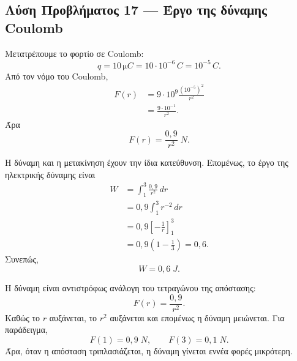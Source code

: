 \subsection*{Λύση Προβλήματος 17 --- Έργο της δύναμης Coulomb}

\begin{alist}
  \item Μετατρέπουμε το φορτίο σε Coulomb:
        \[
          q=10\,\si{\micro C}=10\cdot10^{-6}\,\si{C}=10^{-5}\,\si{C}.
        \]
        Από τον νόμο του Coulomb,
        \begin{align*}
          F(r)
          &=9\cdot10^9\frac{(10^{-5})^2}{r^2}\\
          &=\frac{9\cdot10^{-1}}{r^2}.
        \end{align*}
        Άρα
        \[
          {F(r)=\frac{0{,}9}{r^2}\;\si{N}}.
        \]

  \item Η δύναμη και η μετακίνηση έχουν την ίδια κατεύθυνση. Επομένως,
        το έργο της ηλεκτρικής δύναμης είναι
        \begin{align*}
          W
          &=\int_1^3\frac{0{,}9}{r^2}\,dr\\
          &=0{,}9\int_1^3r^{-2}\,dr\\
          &=0{,}9\left[-\frac{1}{r}\right]_1^3\\
          &=0{,}9\left(1-\frac{1}{3}\right)
           =0{,}6.
        \end{align*}
        Συνεπώς,
        \[
          {W=0{,}6\;\si{J}}.
        \]

  \item Η δύναμη είναι αντιστρόφως ανάλογη του τετραγώνου της
        απόστασης:
        \[
          F(r)=\frac{0{,}9}{r^2}.
        \]
        Καθώς το $r$ αυξάνεται, το $r^2$ αυξάνεται και επομένως η
        δύναμη μειώνεται. Για παράδειγμα,
        \[
          F(1)=0{,}9\;\si{N},
          \qquad
          F(3)=0{,}1\;\si{N}.
        \]
        Άρα, όταν η απόσταση τριπλασιάζεται, η δύναμη γίνεται εννέα
        φορές μικρότερη.
\end{alist}
